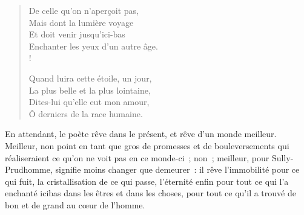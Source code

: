 \documentclass[french,twoside]{book} %
\begin{document}
\begin{verse}
De celle qu’on n’aperçoit pas,\\
Mais dont la lumière voyage\\
Et doit venir jusqu’ici-bas\\
Enchanter les yeux d’un autre âge.\\!

Quand luira cette étoile, un jour,\\
La plus belle et la plus lointaine,\\
Dites-lui qu’elle eut mon amour,\\
Ô derniers de la race humaine.\\
\end{verse}

\noindent En attendant, le poète rêve dans le présent, et rêve d’un monde meilleur. Meilleur, non point en tant que gros de promesses et de bouleversements qui réaliseraient ce qu’on ne voit pas en ce monde-ci ; non ; meilleur, pour Sully-Prudhomme, signifie moins changer que demeurer : il rêve l’immobilité pour ce qui fuit, la cristallisation de ce qui passe, l’éternité enfin pour tout ce qui l’a enchanté icibas dans les êtres et dans les choses, pour tout ce qu’il a trouvé de bon et de grand au cœur de l’homme.\par
\end{document}
